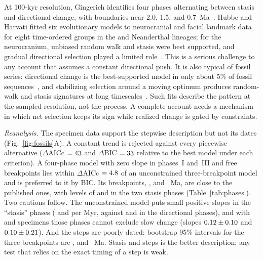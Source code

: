 At 100-kyr resolution, Gingerich identifies four phases alternating between stasis and directional change, with boundaries
near 2.0, 1.5, and 0.7~Ma~\cite{gingerich2022}. Hubbe and Harvati fitted six evolutionary models to neurocranial and facial
landmark data for eight time-ordered groups in the \Hs{} and Neanderthal lineages; for the neurocranium, unbiased random walk
and stasis were best supported, and gradual directional selection played a limited role~\cite{hubbe2026}. This is a serious
challenge to any account that assumes a constant directional push. It is also typical of fossil series: directional change
is the best-supported model in only about 5\% of fossil sequences~\cite{hunt2007}, and stabilizing selection around a moving
optimum produces random-walk and stasis signatures at long timescales~\cite{estes2007}. Such fits describe the pattern at
the sampled resolution, not the process. A complete account needs a mechanism in which net selection keeps its sign while
realized change is gated by constraints.

\textit{Reanalysis.} The specimen data support the stepwise description but not its dates (Fig.~\ref{fig:fossils}A). A
constant trend is rejected against every piecewise alternative ($\Delta$AICc $=43$ and $\Delta$BIC $=33$ relative
to the best model under each criterion). A four-phase model with zero slope in phases~I and~III and free breakpoints lies
within $\Delta$AICc $=4.8$ of an unconstrained three-breakpoint model and is preferred to it by BIC. Its breakpoints,
\FosBpA, \FosBpB{} and \FosBpC~Ma, are close to the published ones, with levels of \FosLevI{} and \FosLevIII\ccm{} in the two
stasis phases (Table~\ref{tab:phases}). Two cautions follow. The unconstrained model puts small positive slopes in the
``stasis'' phases (\FosFreeSlA{} and \FosFreeSlC{} per Myr, against \FosFreeSlB{} and \FosFreeSlD{} in the directional phases),
and with \FosStIN{} and \FosStIIIN{} specimens those phases cannot exclude slow change (slopes $0.12\pm0.10$ and
$0.10\pm0.21$). And the steps are poorly dated: bootstrap 95\% intervals for the three breakpoints are \FosCIA,
\FosCIB{} and \FosCIC~Ma. Stasis and steps is the better description; any test that relies on the exact timing of a step
is weak.

